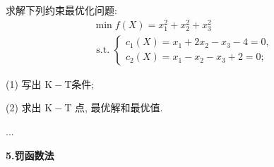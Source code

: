 \documentclass[cn]{elegantbook}
\begin{document}
\begin{exercisez}
求解下列约束最优化问题:
$$
\begin{array}{l}
\min f(X)=x_{1}^{2}+x_{2}^{2}+x_{3}^{2} \\
\text { s.t. }\left\{\begin{array}{l}
c_{1}(X)=x_{1}+2 x_{2}-x_{3}-4=0, \\
c_{2}(X)=x_{1}-x_{2}-x_{3}+2=0 ;
\end{array}\right.
\end{array}
$$

(1) 写出  $\mathrm{K}-\mathrm{T}  $条件;

(2) 求出 $ \mathrm{K}-\mathrm{T} $ 点, 最优解和最优值.
\end{exercisez}
\begin{solution}
...
\end{solution}




\newpage
\begin{center}
 \textcolor[rgb]{0.33,0.33,1.00}{\huge \bf{5.罚函数法}}
\end{center}
\end{document}

